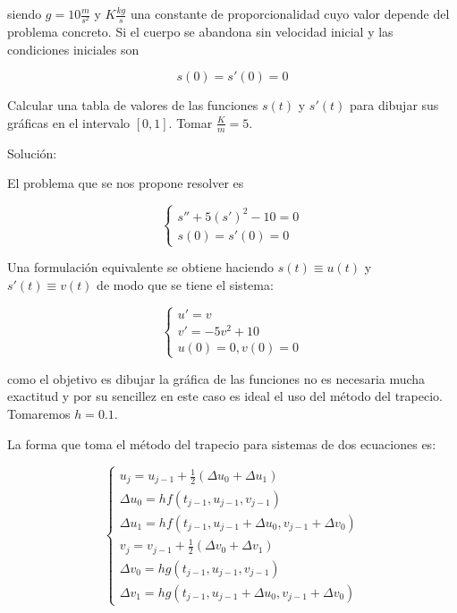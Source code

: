 \documentclass{article}
\theoremstyle{theorem-style}  %
\theoremstyle{definition-style}
\theoremstyle{example-style}
\begin{document}
siendo $g=10 \frac{m}{s^2}$ y $K \frac{kg}{s}$ una constante de proporcionalidad cuyo valor depende del problema concreto. Si el cuerpo se abandona sin velocidad inicial y las condiciones iniciales son


\begin{equation}
s(0)=s'(0)=0
\end{equation}

Calcular una tabla de valores de las funciones $s(t)$ y $s'(t)$ para dibujar sus gráficas en el intervalo $[0,1]$. Tomar $\frac{K}{m}=5$.

Solución:

El problema que se nos propone resolver es

	\begin{equation*}
		\begin{cases}
			s''+5(s')^2-10=0 \\
			s(0)=s'(0)=0
		\end{cases}
	\end{equation*}

Una formulación equivalente se obtiene haciendo $s(t) \equiv u(t)$ y $s'(t) \equiv v(t)$ de modo que se tiene el sistema:

	\begin{equation*}
		\begin{cases}
			u'=v \\
			v'=-5v^2+10 \\
			u(0)=0,v(0)=0
		\end{cases}
	\end{equation*}

como el objetivo es dibujar la gráfica de las funciones no es necesaria mucha exactitud y por su sencillez en este caso es ideal el uso del método del trapecio. Tomaremos $h = 0.1$.

La forma que toma el método del trapecio para sistemas de dos ecuaciones es:

	\begin{equation*}
		\begin{cases}
			u_j=u_{j-1}+\frac{1}{2}(\Delta u_0+\Delta u_1) \\
			\Delta u_0 = hf(t_{j-1},u_{j-1},v_{j-1}) \\
			\Delta u_1 = hf(t_{j-1},u_{j-1}+\Delta u_0,v_{j-1}+\Delta v_0) \\
			v_j=v_{j-1}+\frac{1}{2}(\Delta v_0+\Delta v_1) \\
			\Delta v_0 = hg(t_{j-1},u_{j-1},v_{j-1}) \\
			\Delta v_1 = hg(t_{j-1},u_{j-1}+\Delta u_0,v_{j-1}+\Delta v_0)
		\end{cases}
	\end{equation*}
\end{document}

